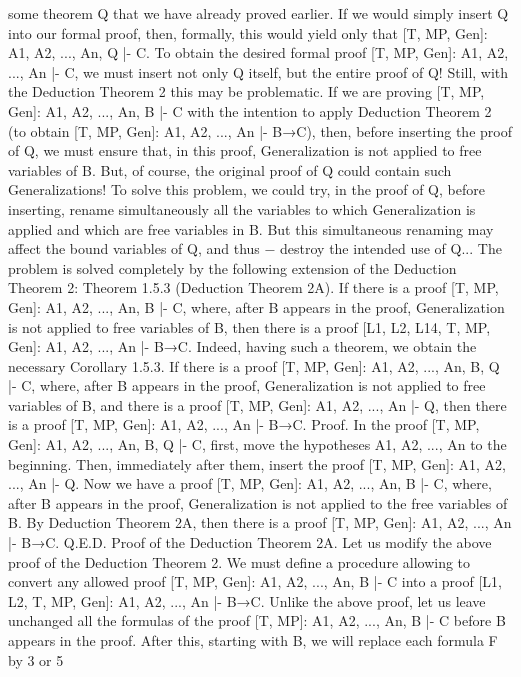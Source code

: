 some theorem Q that we have already proved earlier. If we would simply insert Q into our formal proof,
then, formally, this would yield only that [T, MP, Gen]: A1, A2, ..., An, Q |- C. To obtain the desired formal
proof [T, MP, Gen]: A1, A2, ..., An |- C, we must insert not only Q itself, but the entire proof of Q!
Still, with the Deduction Theorem 2 this may be problematic. If we are proving [T, MP, Gen]: A1, A2, ...,
An, B |- C with the intention to apply Deduction Theorem 2 (to obtain [T, MP, Gen]: A1, A2, ..., An |-
B→C), then, before inserting the proof of Q, we must ensure that, in this proof, Generalization is not
applied to free variables of B. But, of course, the original proof of Q could contain such Generalizations!
To solve this problem, we could try, in the proof of Q, before inserting, rename simultaneously all the
variables to which Generalization is applied and which are free variables in B. But this simultaneous
renaming may affect the bound variables of Q, and thus − destroy the intended use of Q...
The problem is solved completely by the following extension of the Deduction Theorem 2:
Theorem 1.5.3 (Deduction Theorem 2A). If there is a proof [T, MP, Gen]: A1, A2, ..., An, B |- C, where,
after B appears in the proof, Generalization is not applied to free variables of B, then there is a proof
[L1, L2, L14, T, MP, Gen]: A1, A2, ..., An |- B→C.
Indeed, having such a theorem, we obtain the necessary
Corollary 1.5.3. If there is a proof [T, MP, Gen]: A1, A2, ..., An, B, Q |- C, where, after B appears in the
proof, Generalization is not applied to free variables of B, and there is a proof [T, MP, Gen]: A1, A2, ...,
An |- Q, then there is a proof [T, MP, Gen]: A1, A2, ..., An |- B→C.
Proof. In the proof [T, MP, Gen]: A1, A2, ..., An, B, Q |- C, first, move the hypotheses A1, A2, ..., An to the
beginning. Then, immediately after them, insert the proof [T, MP, Gen]: A1, A2, ..., An |- Q. Now we have
a proof [T, MP, Gen]: A1, A2, ..., An, B |- C, where, after B appears in the proof, Generalization is not
applied to the free variables of B. By Deduction Theorem 2A, then there is a proof [T, MP, Gen]: A1,
A2, ..., An |- B→C. Q.E.D.
Proof of the Deduction Theorem 2A. Let us modify the above proof of the Deduction Theorem 2.
We must define a procedure allowing to convert any allowed proof [T, MP, Gen]: A1, A2, ..., An, B |- C
into a proof [L1, L2, T, MP, Gen]: A1, A2, ..., An |- B→C.
Unlike the above proof, let us leave unchanged all the formulas of the proof [T, MP]: A1, A2, ..., An, B |-
C before B appears in the proof. After this, starting with B, we will replace each formula F by 3 or 5

